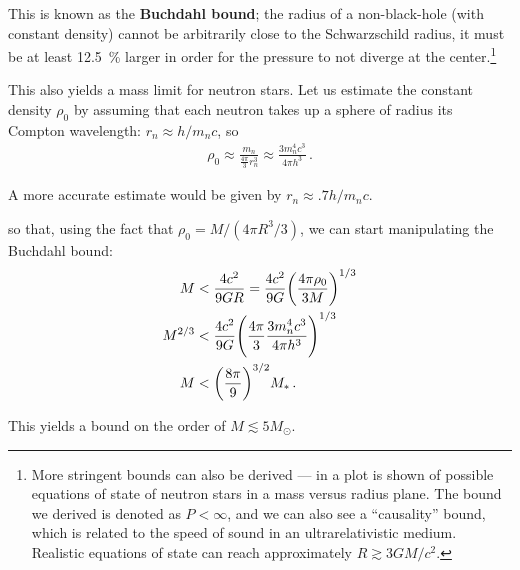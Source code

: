\documentclass[main.tex]{subfiles}
\begin{document}
This is known as the \textbf{Buchdahl bound}; the radius of a non-black-hole (with constant density) cannot be arbitrarily close to the Schwarzschild radius, it must be at least \SI{12.5}{\percent} larger in order for the pressure to not diverge at the center.\footnote{
More stringent bounds can also be derived --- in \textcite[fig.\ 2]{lattimerNeutronStarObservations2007} a plot is shown of possible equations of state of neutron stars in a mass versus radius plane.
The bound we derived is denoted as \(P < \infty \), and we can also see a ``causality'' bound, which is related to the speed of sound in an ultrarelativistic medium.
Realistic equations of state can reach approximately \(R \gtrsim 3GM /c^2\).}

This also yields a mass limit for neutron stars. Let us estimate the constant density \(\rho_0\) by assuming that each neutron takes up a sphere of radius its Compton wavelength: \(r_n \approx h / m_n c\), so 
%
\begin{align}
\rho_0 \approx \frac{m_n}{ \frac{4 \pi }{3} r_n^3}
\approx \frac{3 m_n^4 c^3}{4 \pi h^3}
\,.
\end{align}

A more accurate estimate would be given by \(r_n \approx \num{.7} h / m_n c\).

so that, using the fact that \(\rho_0 = M / ( 4 \pi R^3 / 3)\), we can start manipulating the Buchdahl bound:
%
\begin{align}
M &< \frac{4 c^2}{9GR} = \frac{4 c^2}{9 G} \qty(\frac{4 \pi \rho_0 }{3M})^{1/3}  \\
M^{2/3} &< \frac{4 c^2}{9G} \qty(\frac{4 \pi }{3} \frac{3 m_n^4 c^3}{4 \pi h^3})^{1/3} \\
M  &< \qty(\frac{8 \pi}{9})^{3/2} M_{*}
\,.
\end{align}

This yields a bound on the order of \(M \lesssim 5 M_{\odot}\).


\end{document}
